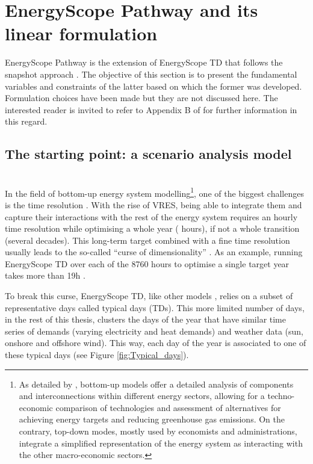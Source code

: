 \section{EnergyScope Pathway and its linear formulation} 
\label{app:ESPathway_full_formulation}

EnergyScope Pathway is the extension of EnergyScope TD \cite{limpens2019energyscope} that follows the snapshot approach \cite{Girones2015}. The objective of this section is to present the fundamental variables and constraints of the latter based on which the former was developed. Formulation choices have been made but they are not discussed here. The interested reader is invited to refer to Appendix B of \cite{limpens2024pathway} for further information in this regard.

\newpage
\subsection{The starting point: a scenario analysis model}
\label{app:ESTD}

\\

\noindent
In the field of bottom-up energy system modelling\footnote{As detailed by \citet{prina2020classification}, bottom-up models offer a detailed analysis of components and interconnections within different energy sectors, allowing for a techno-economic comparison of technologies and assessment of alternatives for achieving energy targets and reducing greenhouse gas emissions. On the contrary, top-down modes, mostly used by economists and administrations, integrate a simplified representation of the energy system as interacting with the other macro-economic sectors.}, one of the biggest challenges is the time resolution \cite{prina2020classification}. With the rise of \gls{VRES}, being able to integrate them and capture their interactions with the rest of the energy system requires an hourly time resolution while optimising a whole year ( hours), if not a whole transition (\ie several decades). This long-term target combined with a fine time resolution usually leads to the so-called ``curse of dimensionality'' \cite{kuo2005lifting}. As an example, running EnergyScope TD over each of the 8760 hours to optimise a single target year takes more than 19h \cite{limpens2019energyscope}.

To break this curse, EnergyScope TD, like other models \cite{Gabrielli2018,Despres2017,Nahmmacher2014}, relies on a subset of representative days called typical days (TDs). This more limited number of days,  in the rest of this thesis, clusters the days of the year that have similar time series of demands (\ie varying electricity and heat demands) and weather data (\ie sun, onshore and offshore wind). This way, each day of the year is associated to one of these typical days (see Figure \ref{fig:Typical_days}).

